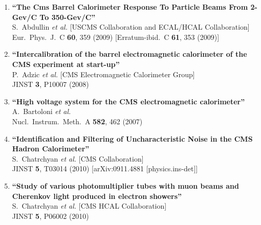 \documentclass[10pt]{letter}
\begin{document}
\begin{enumerate}
\item%
{\bf ``The Cms Barrel Calorimeter Response To Particle Beams From 2-Gev/C To 350-Gev/C''}
  \\{}S.~Abdullin {\it et al.}  [USCMS Collaboration and ECAL/HCAL
                  Collaboration]
  \\{}Eur.\ Phys.\ J.\  C {\bf 60}, 359 (2009)
  [Erratum-ibid.\  C {\bf 61}, 353 (2009)]

\item%
{\bf ``Intercalibration of the barrel electromagnetic calorimeter of the CMS  experiment at start-up''}
  \\{}P.~Adzic {\it et al.}  [CMS Electromagnetic Calorimeter Group]
  \\{}JINST {\bf 3}, P10007 (2008)

\item%
{\bf ``High voltage system for the CMS electromagnetic calorimeter''}
  \\{}A.~Bartoloni {\it et al.}
  \\{}Nucl.\ Instrum.\ Meth.\  A {\bf 582}, 462 (2007)

\item%
{\bf ``Identification and Filtering of Uncharacteristic Noise in the CMS Hadron Calorimeter''}
  \\{}S.~Chatrchyan {\it et al.}  [CMS Collaboration]
  \\{}JINST {\bf 5}, T03014 (2010)
  [arXiv:0911.4881 [physics.ins-det]]

\item%
{\bf ``Study of various photomultiplier tubes with muon beams and Cherenkov light produced in electron showers''}
  \\{}S.~Chatrchyan {\it et al.}  [CMS HCAL Collaboration]
  \\{}JINST {\bf 5}, P06002 (2010)


\end{enumerate}
\end{document}
